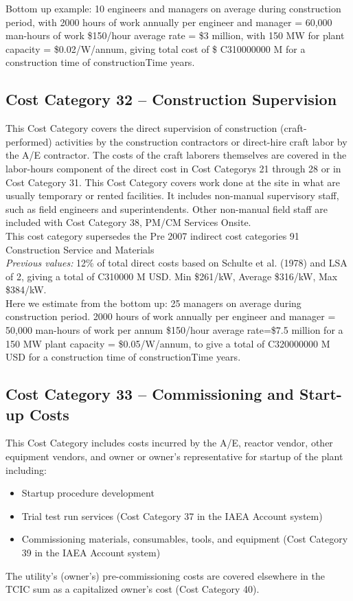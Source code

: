 Bottom up example: 10 engineers and managers on average during construction period, with 2000 hours of work annually per engineer and manager = 60,000 man-hours of work \$150/hour average rate = \$3 million, with 150 MW for plant capacity = \$0.02/W/annum, giving total cost of \$ C310000000 M for a construction time of constructionTime years.


\subsection*{Cost Category 32 – Construction Supervision}
This Cost Category covers the direct supervision of construction (craft-performed) activities by the construction contractors or direct-hire craft labor by the A/E contractor. The costs of the craft laborers themselves are covered in the labor-hours component of the direct cost in Cost Categorys 21 through 28 or in Cost Category 31. This Cost Category covers work done at the site in what are usually temporary or rented facilities. It includes non-manual supervisory staff, such as field engineers and superintendents. Other non-manual field staff are included with Cost Category 38, PM/CM Services Onsite.\\

This cost category supersedes the Pre 2007 indirect cost categories 91 Construction Service and Materials  \\

\emph{Previous values: }
12\% of total direct costs based on Schulte et al. (1978) and LSA of 2, giving a total of C310000 M USD. Min \$261/kW, Average \$316/kW, Max \$384/kW. \\

Here we estimate from the bottom up: 25 managers on average during construction period. 2000 hours of work annually per engineer and manager = 50,000 man-hours of work per annum \$150/hour average rate=\$7.5 million for a 150 MW plant capacity = \$0.05/W/annum, to give a total of C320000000 M USD for a construction time of constructionTime years.

\subsection*{Cost Category 33 – Commissioning and Start-up Costs}
This Cost Category includes costs incurred by the A/E, reactor vendor, other equipment vendors, and owner or owner’s representative for startup of the plant including:
\begin{itemize}
    \item Startup procedure development
    \item Trial test run services (Cost Category 37 in the IAEA Account system)
    \item Commissioning materials, consumables, tools, and equipment (Cost Category 39 in the IAEA Account system)
\end{itemize}
The utility’s (owner’s) pre-commissioning costs are covered elsewhere in the TCIC sum as a capitalized owner’s cost (Cost Category 40).

